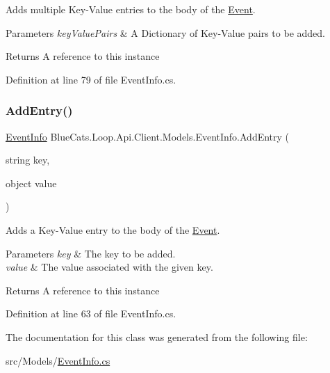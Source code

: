 Adds multiple Key-\/\+Value entries to the body of the \mbox{\hyperlink{class_blue_cats_1_1_loop_1_1_api_1_1_client_1_1_models_1_1_event}{Event}}. 


\begin{DoxyParams}{Parameters}
{\em key\+Value\+Pairs} & A Dictionary of Key-\/\+Value pairs to be added.\\
\hline
\end{DoxyParams}
\begin{DoxyReturn}{Returns}
A reference to this instance
\end{DoxyReturn}


Definition at line 79 of file Event\+Info.\+cs.

\mbox{\label{class_blue_cats_1_1_loop_1_1_api_1_1_client_1_1_models_1_1_event_info_af1136bc0c4352fedd851550d3a8ace26}} 
\subsubsection{\texorpdfstring{Add\+Entry()}{AddEntry()}}
{\footnotesize\ttfamily \mbox{\hyperlink{class_blue_cats_1_1_loop_1_1_api_1_1_client_1_1_models_1_1_event_info}{Event\+Info}} Blue\+Cats.\+Loop.\+Api.\+Client.\+Models.\+Event\+Info.\+Add\+Entry (\begin{DoxyParamCaption}\item[{string}]{key,  }\item[{object}]{value }\end{DoxyParamCaption})\hspace{0.3cm}{\ttfamily [inline]}}



Adds a Key-\/\+Value entry to the body of the \mbox{\hyperlink{class_blue_cats_1_1_loop_1_1_api_1_1_client_1_1_models_1_1_event}{Event}}. 


\begin{DoxyParams}{Parameters}
{\em key} & The key to be added.\\
\hline
{\em value} & The value associated with the given key.\\
\hline
\end{DoxyParams}
\begin{DoxyReturn}{Returns}
A reference to this instance
\end{DoxyReturn}


Definition at line 63 of file Event\+Info.\+cs.



The documentation for this class was generated from the following file\+:\begin{DoxyCompactItemize}
\item 
src/\+Models/\mbox{\hyperlink{_event_info_8cs}{Event\+Info.\+cs}}\end{DoxyCompactItemize}

